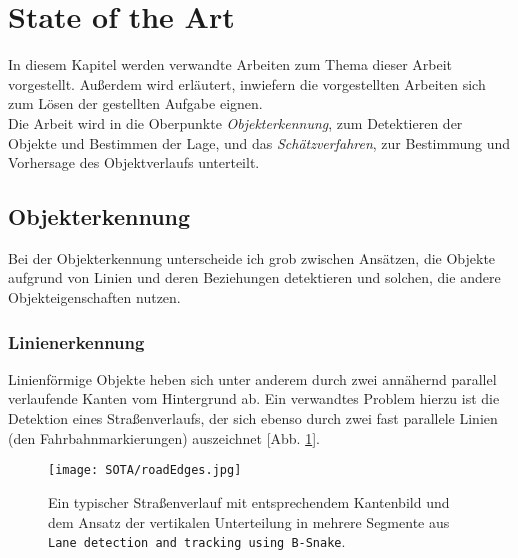 \section{State of the Art}
In diesem Kapitel werden verwandte Arbeiten zum Thema dieser Arbeit vorgestellt. Außerdem wird erläutert, inwiefern die vorgestellten Arbeiten sich zum Lösen der gestellten Aufgabe eignen.\\
Die Arbeit wird in die Oberpunkte \textit{Objekterkennung}, zum Detektieren der Objekte und Bestimmen der Lage, und das \textit{Schätzverfahren}, zur Bestimmung und Vorhersage des Objektverlaufs unterteilt.
\subsection{Objekterkennung}
Bei der Objekterkennung unterscheide ich grob zwischen Ansätzen, die Objekte aufgrund von Linien und deren Beziehungen detektieren und solchen, die andere Objekteigenschaften nutzen.
\subsubsection{Linienerkennung}
Linienförmige Objekte heben sich unter anderem durch zwei annähernd parallel verlaufende Kanten vom Hintergrund ab.
Ein verwandtes Problem hierzu ist die Detektion eines Straßenverlaufs, der sich ebenso durch zwei fast parallele Linien (den Fahrbahnmarkierungen) auszeichnet [Abb. \ref{Abb. 4}].\\
\begin{figure}[H]
	\texttt{[image: SOTA/roadEdges.jpg]}
	\caption[Typischer Straßenverlauf mit entpsrechendem Kantenbild]{Ein typischer Straßenverlauf mit entsprechendem Kantenbild und dem Ansatz der vertikalen Unterteilung in mehrere Segmente aus \texttt{Lane detection and tracking using B-Snake}\cite{wang2004lane}.}
	\label{Abb. 4}
\end{figure}

